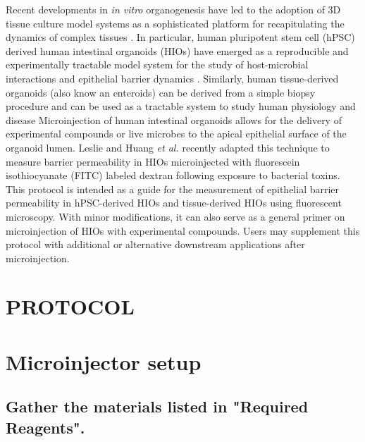 \documentclass[11pt]{article}
\begin{document}
Recent developments in \emph{in vitro} organogenesis have led to the adoption of 3D tissue culture model systems as a sophisticated platform for recapitulating the dynamics of complex tissues \supercite{Sato:2009,Clevers:2016,Drost:2016,Rookmaaker:2015,Spence:2011,Aurora:2016,Dedhia:2016,Dye:2015,Dye:2016}. In particular, human pluripotent stem cell (hPSC) derived human intestinal organoids (HIOs) \supercite{Spence:2011,McCracken:2011} have emerged as a reproducible and experimentally tractable model system for the study of host-microbial interactions and epithelial barrier dynamics \supercite{Leslie:2015,Leslie:2016,Zachos:2016, Hill:2017}. Similarly, human tissue-derived organoids (also know an enteroids) can be derived from a simple biopsy procedure and can be used as a tractable system to study human physiology and disease \supercite{Sato:2009,Miyoshi:2013,Sato:2011} Microinjection of human intestinal organoids allows for the delivery of experimental compounds \supercite{Leslie:2015} or live microbes \supercite{Engevik:2013, Leslie:2015,Forbester:2015,Engevik:2015} to the apical epithelial surface of the organoid lumen. Leslie and Huang \emph{et al.}\supercite{Leslie:2015} recently adapted this technique to measure barrier permeability in HIOs microinjected with fluorescein isothiocyanate (FITC) labeled dextran following exposure to bacterial toxins.\\

This protocol is intended as a guide for the measurement of epithelial barrier permeability in hPSC-derived HIOs and tissue-derived HIOs using fluorescent microscopy. With minor modifications, it can also serve as a general primer on microinjection of HIOs with experimental compounds. Users may supplement this protocol with additional or alternative downstream applications after microinjection.\\

\section*{PROTOCOL}
\section{{\bfseries\sffamily } Microinjector setup}
\label{sec:orgheadline10}
\subsection{{\bfseries\sffamily } Gather the materials listed in "Required Reagents".}
\label{sec:orgheadline1}
\end{document}
